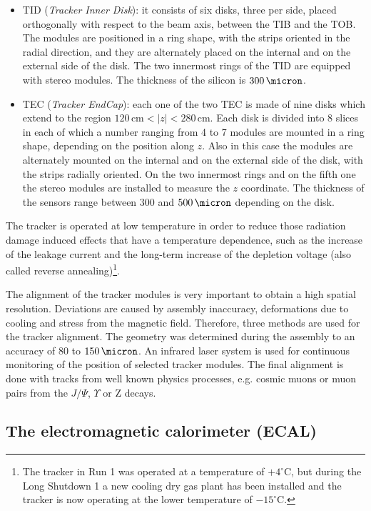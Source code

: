 \begin{itemize}
\item TID (\emph{Tracker Inner Disk}): it consists of six disks, three per side, placed orthogonally with respect to the beam axis, between the TIB and the TOB. The modules are positioned in a ring shape, with the strips oriented in the radial direction, and they are alternately placed on the internal and on the external side of the disk. The two innermost rings of the TID are equipped with stereo modules. The thickness of the silicon is $300\,\micron$.
\item TEC (\emph{Tracker EndCap}): each one of the two TEC is made of nine disks which extend to the region $120\,\mathrm{cm} < |z| < 280\,\mathrm{cm}$. Each disk is divided into 8 slices in each of which a number ranging from 4 to 7 modules are mounted in a ring shape, depending on the position along $z$. Also in this case the modules are alternately mounted on the internal and on the external side of the disk, with the strips radially oriented. On the two innermost rings and on the fifth one the stereo modules are installed to measure the $z$ coordinate. The thickness of the sensors range between 300 and $500\,\micron$ depending on the disk.
\end{itemize}
The tracker is operated at low temperature in order to reduce those radiation damage induced effects that have a temperature dependence, such as the increase of the leakage current and the long-term increase of the depletion voltage (also called reverse annealing)\footnote{The tracker in Run 1 was operated at a temperature of $+4^{\circ}$C, but during the Long Shutdown 1 a new cooling dry gas plant has been installed and the tracker is now operating at the lower temperature of $-15^{\circ}$C.}.

The alignment of the tracker modules is very important to obtain a high spatial resolution. Deviations are caused by assembly inaccuracy, deformations due to cooling and stress from the magnetic field. Therefore, three methods are used for the tracker alignment.
The geometry was determined during the assembly to an accuracy of 80 to $150\,\micron$. An infrared laser system is used for continuous monitoring of the position of selected tracker modules. The final alignment is done with tracks from well known physics processes, e.g. cosmic muons or muon pairs from the $J/\Psi$, $\Upsilon$ or Z decays.

\subsection{The electromagnetic calorimeter (ECAL)}

